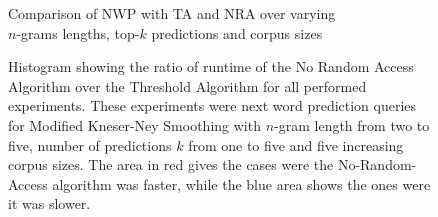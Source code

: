 \begin{figure}[p!]
  \centering
  Comparison of NWP with TA and NRA over varying\\
  $n$-grams lengths, top-$k$ predictions and corpus sizes
  \\[1.5ex]
  \begin{minipage}{1.4\textwidth}
    \centering
    \hspace{-0.2\textwidth}
    
  \end{minipage}
  \caption{Histogram showing the ratio of runtime of the No Random Access
    Algorithm over the Threshold Algorithm for all performed experiments.
    These experiments were next word prediction queries for Modified Kneser-Ney
    Smoothing with $n$-gram length from two to five, number of predictions $k$
    from one to five and five increasing corpus sizes.
    The area in red gives the cases were the No-Random-Access algorithm was
    faster, while the blue area shows the ones were it was slower.}
  \label{fig:evaluation-comp-nra-ta}
\end{figure}

